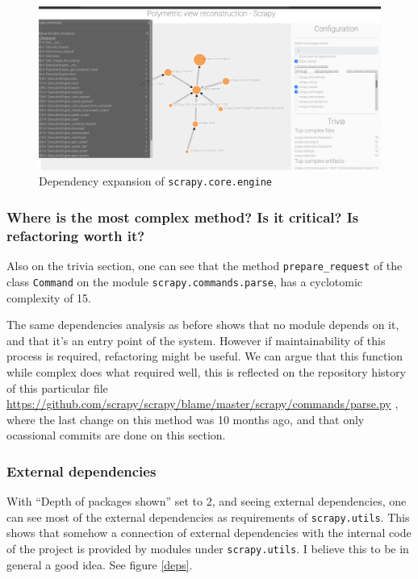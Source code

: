 \documentclass[a4paper,11pt]{article}
\begin{document}
\begin{figure}
\includegraphics[width=.9\linewidth]{../screenshots/coreengine.png}
\caption{Dependency expansion of \texttt{scrapy.core.engine}}
\label{coreengine}
\end{figure}

\subsubsection{Where is the most complex method? Is it critical? Is refactoring worth it?}
\label{sec:orgdb2f33a}
Also on the trivia section, one can see that the method \texttt{prepare\_request} of the class \texttt{Command} on the module \texttt{scrapy.commands.parse}, has a cyclotomic complexity of 15.

The same dependencies analysis as before shows that no module depends on it, and that it's an entry point of the system. However if maintainability of this process is required, refactoring might be useful. We can argue that this function while complex does what required well, this is reflected on the repository history of this particular file \url{https://github.com/scrapy/scrapy/blame/master/scrapy/commands/parse.py} , where the last change on this method was 10 months ago, and that only ocassional commits are done on this section.

\subsubsection{External dependencies}
\label{sec:org3a2966d}
With ``Depth of packages shown'' set to 2, and seeing external dependencies, one can see most of the external dependencies as requirements of \texttt{scrapy.utils}. This shows that somehow a connection of external dependencies with the internal code of the project is provided by modules under \texttt{scrapy.utils}. I believe this to be in general a good idea. See figure \ref{deps}.
\end{document}
